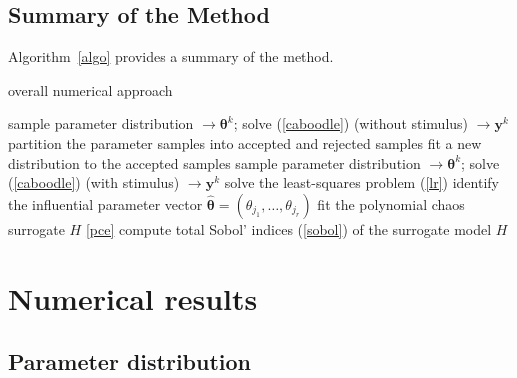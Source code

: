 \documentclass[smallextended]{svjour3}
\numberwithin{equation}{section}
\begin{document}
\subsection{Summary of the Method}
\label{sec:summary}
Algorithm~\ref{algo} provides a summary of the method. 

\begin{algorithm}
\caption{overall numerical approach}\label{algo}
\begin{algorithmic}[1]
 
\State sample parameter distribution  $\longrightarrow \boldsymbol{\theta}^k$; solve (\ref{caboodle}) (without stimulus) $\longrightarrow \mathbf y^k$
\EndFor
\State partition the parameter samples into accepted and rejected samples
\State fit a new distribution to the accepted samples 
\EndWhile
{} 
\State sample parameter distribution  $\longrightarrow \boldsymbol{\theta}^k$; solve (\ref{caboodle}) (with stimulus) $\longrightarrow \mathbf y^k$
\EndFor
{}
\State solve the least-squares problem (\ref{lr}) 
\State identify the influential parameter vector $\hat{\boldsymbol\theta} =   (\theta_{j_1}, \dots, \theta_{j_r})$  
\State fit the polynomial chaos surrogate $H$ \eqref{pce} 
\State compute total Sobol' indices (\ref{sobol}) of the surrogate model $H$ 
\EndFor
\end{algorithmic}
\end{algorithm}

\section{Numerical results}
\label{sec:results}

\subsection{Parameter distribution}
\label{sec:param_sampling}
\end{document}
